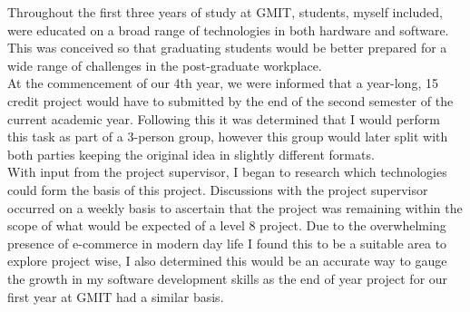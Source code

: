 Throughout the first three years of study at GMIT, students, myself included, were educated on a broad range of technologies in both hardware and software. This was conceived so that graduating students would be better prepared for a wide range of challenges in the post-graduate workplace.\\
At the commencement of our 4th year, we were informed that a year-long, 15 credit project would have to submitted by the end of the second semester of the current academic year. Following this it was determined that I would perform this task as part of a 3-person group, however this group would later split with both parties keeping the original idea in slightly different formats. \\
With input from the project supervisor, I began to research which technologies could form the basis of this project. Discussions with the project supervisor occurred on a weekly basis to ascertain that the project was remaining within the scope of what would be expected of a level 8 project. Due to the overwhelming presence of e-commerce in modern day life I found this to be a suitable area to explore project wise, I also determined this would be an accurate way to gauge the growth in my software development skills as the end of year project for our first year at GMIT had a similar basis. 

\newpage
